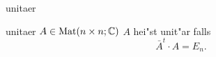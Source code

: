 \documentclass[class=article, crop=false]{standalone}
\begin{document}
\begin{zettel}{unitaer}
\begin{flashcard}[pmd4fl42]{unitaer}
	$ A \in  \operatorname{Mat}(n \times n; \mathbb{C} )$
	$A$ hei"st unit"ar falls
	\[
		\bar{A}^t \cdot  A = E_n
	.\]
\end{flashcard}
\end{zettel}
\end{document}
